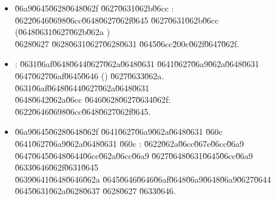 \documentclass[12pt,a4paper]{article}
\begin{document}
\begin{itemize}
\item \u06a9\u0645\u0628\u0648\u062f \u0627\u0631\u062b\u06cc : \u0622\u0646\u0698\u06cc\u0648\u0627\u062f\u0645 \u0627\u0631\u062b\u06cc (\u0648\u0631\u0627\u062b\u062a ) \\
\u0628\u0627  \u0628\u0631\u0627\u0628\u0631 \u0645\u06cc\u200c\u062f\u0647\u062f.
\item {}: \u0631\u06af\u0648\u0644\u0627\u062a\u0648\u0631 \u0641\u0627\u06a9\u062a\u0648\u0631 \u0647\u0627\u06af\u0645\u0646 () \u0627\u0633\u062a. \\
\u0631\u06af\u0648\u0644\u0627\u062a\u0648\u0631  \\
\u0648\u0642\u062a\u06cc \u0646\u0628\u0627\u0634\u062f: \u0622\u0646\u0698\u06cc\u0648\u0627\u062f\u0645.
\item \u06a9\u0645\u0628\u0648\u062f \u0641\u0627\u06a9\u062a\u0648\u0631 \u060c \u0641\u0627\u06a9\u062a\u0648\u0631 \u060c :  \u0622\u062a\u06cc\u067e\u06cc\u06a9 \\
\u0647\u0645\u0648\u0644\u06cc\u062a\u06cc\u06a9 \u0627\u0648\u0631\u0645\u06cc\u06a9 \u0633\u0646\u062f\u0631\u0645 \\
\u0639\u0641\u0648\u0646\u062a \u0645\u0646\u0646\u06af\u0648\u06a9\u0648\u06a9\u0627\u0644 \u0645\u0631\u062a\u0628\u0637 \u0628\u0627 \u0633\u0646.
\end{itemize}

\end{document}
